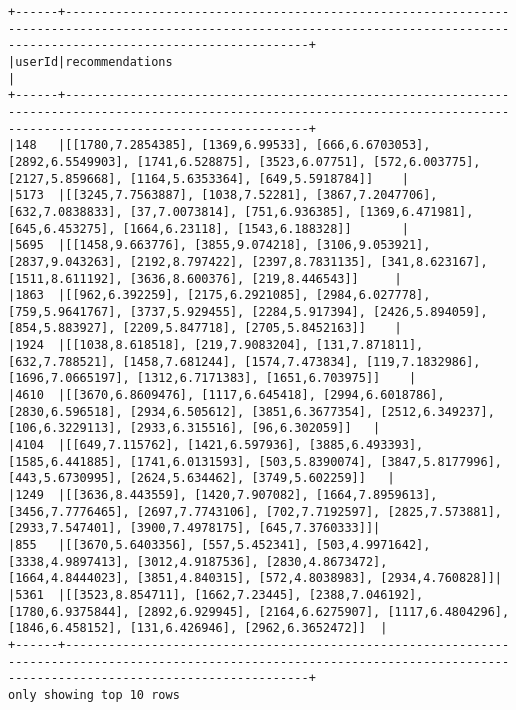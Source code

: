 \documentclass[11pt]{article}
\begin{document}
    \begin{Verbatim}[commandchars=\\\{\}]
+------+------------------------------------------------------------------------------------------------------------------------------------------------------------------------------+
|userId|recommendations                                                                                                                                                               |
+------+------------------------------------------------------------------------------------------------------------------------------------------------------------------------------+
|148   |[[1780,7.2854385], [1369,6.99533], [666,6.6703053], [2892,6.5549903], [1741,6.528875], [3523,6.07751], [572,6.003775], [2127,5.859668], [1164,5.6353364], [649,5.5918784]]    |
|5173  |[[3245,7.7563887], [1038,7.52281], [3867,7.2047706], [632,7.0838833], [37,7.0073814], [751,6.936385], [1369,6.471981], [645,6.453275], [1664,6.23118], [1543,6.188328]]       |
|5695  |[[1458,9.663776], [3855,9.074218], [3106,9.053921], [2837,9.043263], [2192,8.797422], [2397,8.7831135], [341,8.623167], [1511,8.611192], [3636,8.600376], [219,8.446543]]     |
|1863  |[[962,6.392259], [2175,6.2921085], [2984,6.027778], [759,5.9641767], [3737,5.929455], [2284,5.917394], [2426,5.894059], [854,5.883927], [2209,5.847718], [2705,5.8452163]]    |
|1924  |[[1038,8.618518], [219,7.9083204], [131,7.871811], [632,7.788521], [1458,7.681244], [1574,7.473834], [119,7.1832986], [1696,7.0665197], [1312,6.7171383], [1651,6.703975]]    |
|4610  |[[3670,6.8609476], [1117,6.645418], [2994,6.6018786], [2830,6.596518], [2934,6.505612], [3851,6.3677354], [2512,6.349237], [106,6.3229113], [2933,6.315516], [96,6.302059]]   |
|4104  |[[649,7.115762], [1421,6.597936], [3885,6.493393], [1585,6.441885], [1741,6.0131593], [503,5.8390074], [3847,5.8177996], [443,5.6730995], [2624,5.634462], [3749,5.602259]]   |
|1249  |[[3636,8.443559], [1420,7.907082], [1664,7.8959613], [3456,7.7776465], [2697,7.7743106], [702,7.7192597], [2825,7.573881], [2933,7.547401], [3900,7.4978175], [645,7.3760333]]|
|855   |[[3670,5.6403356], [557,5.452341], [503,4.9971642], [3338,4.9897413], [3012,4.9187536], [2830,4.8673472], [1664,4.8444023], [3851,4.840315], [572,4.8038983], [2934,4.760828]]|
|5361  |[[3523,8.854711], [1662,7.23445], [2388,7.046192], [1780,6.9375844], [2892,6.929945], [2164,6.6275907], [1117,6.4804296], [1846,6.458152], [131,6.426946], [2962,6.3652472]]  |
+------+------------------------------------------------------------------------------------------------------------------------------------------------------------------------------+
only showing top 10 rows


    \end{Verbatim}
\end{document}
